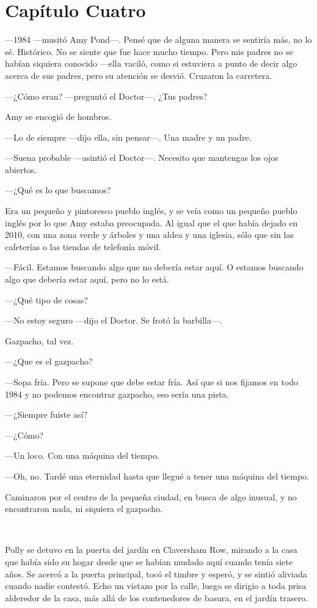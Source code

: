 \chapter*{Capítulo Cuatro} 

---1984 ---musitó Amy Pond---. Pensé que de alguna manera se sentiría más, no lo sé. Histórico. No se siente que fue hace mucho tiempo. Pero mis padres no se habían siquiera conocido ---ella vaciló, como si estuviera a punto de decir algo acerca de sus padres, pero su atención se desvió. Cruzaron la carretera.

---¿Cómo eran? ---preguntó el Doctor---. ¿Tus padres?

Amy se encogió de hombros.

---Lo de siempre ---dijo ella, sin pensar---. Una madre y un padre.

---Suena probable ---asintió el Doctor---. Necesito que mantengas los ojos abiertos.

---¿Qué es lo que buscamos?

Era un pequeño y pintoresco pueblo inglés, y se veía como un pequeño pueblo inglés por lo que Amy estaba preocupada. Al igual que el que había dejado en 2010, con una zona verde y árboles y una aldea y una iglesia, sólo que sin las cafeterías o las tiendas de telefonía móvil.

---Fácil. Estamos buscando algo que no debería estar aquí. O estamos buscando algo que debería estar aquí, pero no lo está.

---¿Qué tipo de cosas?

---No estoy seguro ---dijo el Doctor. Se frotó la barbilla---.

Gazpacho, tal vez.

---¿Que es el gazpacho?

---Sopa fría. Pero se supone que debe estar fría. Así que si nos fijamos en todo 1984 y no podemos encontrar gazpacho, eso sería una pista.

---¿Siempre fuiste así?

---¿Cómo?

---Un loco. Con una máquina del tiempo.

---Oh, no. Tardé una eternidad hasta que llegué a tener una máquina del tiempo.

Caminaron por el centro de la pequeña ciudad, en busca de algo inusual, y no encontraron nada, ni siquiera el gazpacho.

~

Polly se detuvo en la puerta del jardín en Claversham Row, mirando a la casa que había sido su hogar desde que se habían mudado aquí cuando tenía siete años. Se acercó a la puerta principal, tocó el timbre y esperó, y se sintió aliviada cuando nadie contestó. Echo un vistazo por la calle, luego se dirigio a toda prisa alderedor de la casa, más allá de los contenedores de basura, en el jardín trasero.

